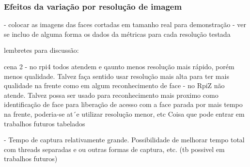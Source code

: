 \subsubsection{Efeitos da variação por resolução de imagem}


- colocar as imagens das faces cortadas em tamanho real para demonstração
- ver se incluo de alguma forma os dados da métricas para cada resolução testada



lembretes para discussão:

cena 2
- no rpi4 todos atendem e qaunto menos resolução mais rápido, porém menos qualidade. Talvez faça sentido usar resolução mais alta para ter mais qualidade na frente como em algum reconhecimento de face
- no RpiZ não atende. Talvez possa ser usado para reconhecimento mais proximo como identificação de face para liberação de acesso com a face parada por mais tempo na frente, poderia-se at´e utilizar resolução menor, etc Coisa que pode entrar em trabalhos futuros tabelados

- Tempo de captura relativamente grande. Possibilidade de melhorar tempo total com threads separadas e ou outras formas de captura, etc. (tb possivel em trabalhos futuros)